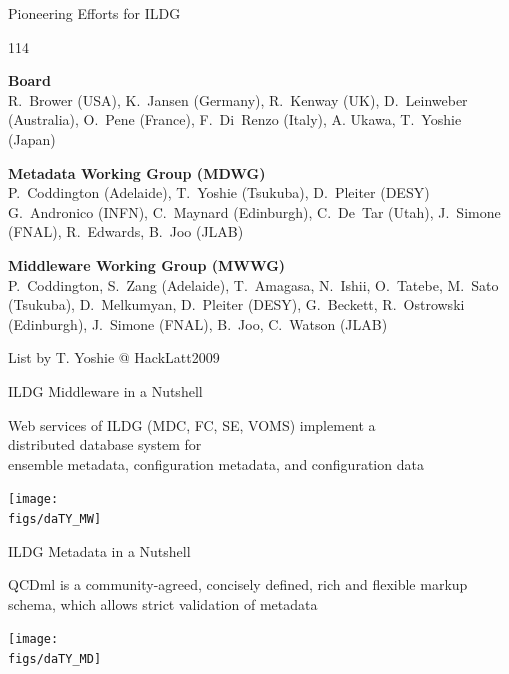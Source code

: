 \documentclass[aspectratio=169,xcolor=dvipsnames]{beamer}
\def\figs{figs1}
\begin{document}
\begin{frame}{Pioneering Efforts for ILDG}
  \begin{dinglist}{114}
    \item {\bf  Board} \\
         {\small
           R.~Brower (USA), K.~Jansen (Germany), R.~Kenway (UK), D.~Leinweber (Australia),
           O.~Pene (France), F.~Di~Renzo (Italy), A. Ukawa, T.~Yoshie (Japan)
         }\\[5mm]


       \item {\bf Metadata Working Group (MDWG)} \\
         {\small
           P.~Coddington (Adelaide), T.~Yoshie (Tsukuba), D.~Pleiter (DESY)
           G.~Andronico (INFN), C.~Maynard (Edinburgh), C.~De~Tar (Utah),
           J.~Simone (FNAL), R.~Edwards, B.~Joo (JLAB)
         }\\[5mm]
         
    \item {\bf Middleware Working Group (MWWG)} \\
      {\small
        P.~Coddington, S.~Zang (Adelaide), T.~Amagasa, N.~Ishii, O.~Tatebe, M.~Sato (Tsukuba),
        D.~Melkumyan, D.~Pleiter (DESY), G.~Beckett, R.~Ostrowski (Edinburgh), J.~Simone (FNAL),
        B.~Joo, C.~Watson (JLAB)
      }
  \end{dinglist}
  \hfill   {\small List by T. Yoshie @ HackLatt2009}
\end{frame}


\begin{frame}{ILDG Middleware in a Nutshell}
  \begin{center}
    \Large{Web services of ILDG (\alert{MDC, FC, SE, VOMS}) implement a\\ \alert{distributed database system} for\\
    \alert{ensemble metadata, configuration metadata, and configuration data}}

  \texttt{[image: \\figs/daTY\_MW]}
  \end{center}

\end{frame}
\begin{frame}{ILDG Metadata in a Nutshell}

  \begin{center}
    \Large{\alert{QCDml} is a community-agreed, concisely defined, rich and flexible \alert{markup schema},
      which allows \alert{strict validation of metadata}}
    
  \texttt{[image: \\figs/daTY\_MD]}
  \end{center}
  
\end{frame}
\end{document}
